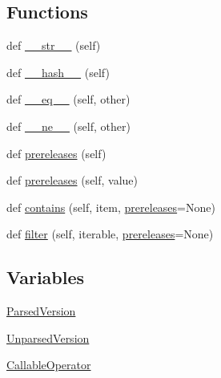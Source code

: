\subsection*{Functions}
\begin{DoxyCompactItemize}
\item 
def \hyperlink{namespacepkg__resources_1_1__vendor_1_1packaging_1_1specifiers_a2004bf80dd38459e922cc6eed236046e}{\+\_\+\+\_\+str\+\_\+\+\_\+} (self)
\item 
def \hyperlink{namespacepkg__resources_1_1__vendor_1_1packaging_1_1specifiers_ae48c6871b5f6019fb9f28ca9297f42be}{\+\_\+\+\_\+hash\+\_\+\+\_\+} (self)
\item 
def \hyperlink{namespacepkg__resources_1_1__vendor_1_1packaging_1_1specifiers_a7b925ccf325426e4d5829a255438ed40}{\+\_\+\+\_\+eq\+\_\+\+\_\+} (self, other)
\item 
def \hyperlink{namespacepkg__resources_1_1__vendor_1_1packaging_1_1specifiers_ab019e8e0f21bbabb453b687dba542054}{\+\_\+\+\_\+ne\+\_\+\+\_\+} (self, other)
\item 
def \hyperlink{namespacepkg__resources_1_1__vendor_1_1packaging_1_1specifiers_a50e6b51a539b89ae6008d54190857f75}{prereleases} (self)
\item 
def \hyperlink{namespacepkg__resources_1_1__vendor_1_1packaging_1_1specifiers_a4e7c7b833e697cfa83a06ec206b5c976}{prereleases} (self, value)
\item 
def \hyperlink{namespacepkg__resources_1_1__vendor_1_1packaging_1_1specifiers_aa8bd89443ae8b900788427e80696e2b8}{contains} (self, item, \hyperlink{namespacepkg__resources_1_1__vendor_1_1packaging_1_1specifiers_a50e6b51a539b89ae6008d54190857f75}{prereleases}=None)
\item 
def \hyperlink{namespacepkg__resources_1_1__vendor_1_1packaging_1_1specifiers_aa03fee032e431f55d4a2ce76d791d244}{filter} (self, iterable, \hyperlink{namespacepkg__resources_1_1__vendor_1_1packaging_1_1specifiers_a50e6b51a539b89ae6008d54190857f75}{prereleases}=None)
\end{DoxyCompactItemize}
\subsection*{Variables}
\begin{DoxyCompactItemize}
\item 
\hyperlink{namespacepkg__resources_1_1__vendor_1_1packaging_1_1specifiers_af78acb4126f3271a382788afb28015ed}{Parsed\+Version}
\item 
\hyperlink{namespacepkg__resources_1_1__vendor_1_1packaging_1_1specifiers_a0879f03503f6070f4def52e5fe4ed64d}{Unparsed\+Version}
\item 
\hyperlink{namespacepkg__resources_1_1__vendor_1_1packaging_1_1specifiers_af6e482bd0ae19c2e15458e27fd95db3d}{Callable\+Operator}
\end{DoxyCompactItemize}


